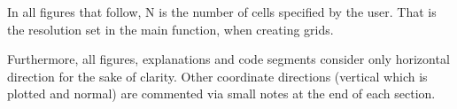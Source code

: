 In all figures that follow, {\sf N} is the number of cells specified by the 
user. That is the resolution set in the main function, when creating grids. 

Furthermore, all figures, explanations and code segments consider only 
horizontal direction for the sake of clarity. Other coordinate directions
(vertical which is plotted and normal) are commented via small notes at the 
end of each section. 
